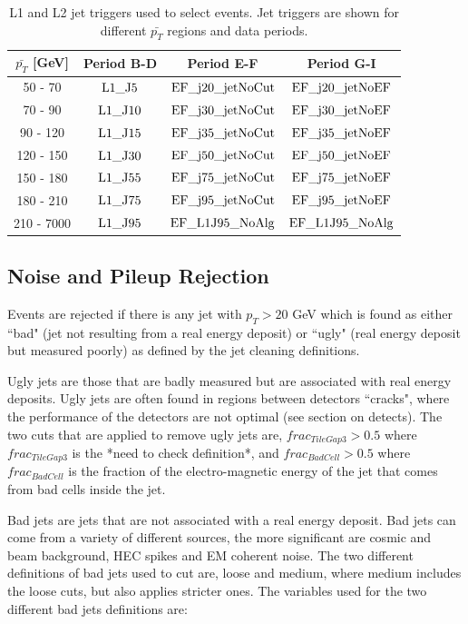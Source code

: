 \begin{table}[htdp]
\centering
\begin{tabular}{ | c | c | c | c | }
  \hline                       
 $\bar{p_T}$ [GeV] & Period B-D & Period E-F & Period G-I \\
  \hline                       
50 - 70   & $\rm L1\_J5$  & $\rm EF\_j20\_jetNoCut$ & $\rm EF\_j20\_jetNoEF$ \\
70 - 90   & $\rm L1\_J10$ & $\rm EF\_j30\_jetNoCut$ & $\rm EF\_j30\_jetNoEF$ \\
90 - 120  & $\rm L1\_J15$ & $\rm EF\_j35\_jetNoCut$ & $\rm EF\_j35\_jetNoEF$ \\
120 - 150  & $\rm L1\_J30$ & $\rm EF\_j50\_jetNoCut$ & $\rm EF\_j50\_jetNoEF$ \\
150 - 180  & $\rm L1\_J55$ & $\rm EF\_j75\_jetNoCut$ & $\rm EF\_j75\_jetNoEF$ \\
180 - 210  & $\rm L1\_J75$ & $\rm EF\_j95\_jetNoCut$ & $\rm EF\_j95\_jetNoEF$ \\ 
210 - 7000  & $\rm L1\_J95$ & $\rm EF\_L1J95\_NoAlg$  & $\rm EF\_L1J95\_NoAlg$ \\
  \hline                       
\end{tabular}
\caption{L1 and L2 jet triggers used to select events. Jet triggers are shown for different $\bar{p_T}$ regions and data periods. \label{tab:trig_strat}}
\end{table}%

\subsection{Noise and Pileup Rejection}
Events are rejected if there is any jet with $p_T>20$ GeV which is found as either ``bad" (jet not resulting from a real energy deposit) or ``ugly" (real energy deposit but measured poorly) as defined by the jet cleaning definitions. 

Ugly jets are those that are badly measured but are associated with real energy deposits.
Ugly jets are often found in regions between detectors ``cracks", where the performance of the detectors are not optimal (see section on detects). 
The two cuts that are applied to remove ugly jets are, 
$frac_{TileGap3}>0.5$ where $frac_{TileGap3}$ is the *need to check definition*, and $frac_{BadCell}>0.5$ where $frac_{BadCell}$ is the fraction of the electro-magnetic energy of the jet that comes from bad cells inside the jet.

Bad jets are jets that are not associated with a real energy deposit. 
Bad jets can come from a variety of different sources, the more significant are cosmic and beam background, HEC spikes and EM coherent noise. 
The two different definitions of bad jets used to cut are, loose and medium, where medium includes the loose cuts, but also applies stricter ones.
The variables used for the two different bad jets definitions are:

